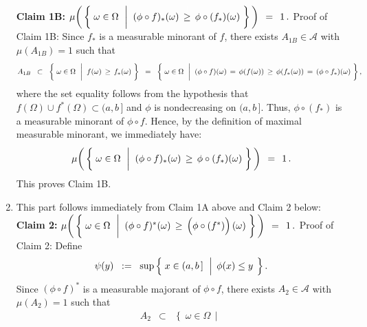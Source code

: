 \begin{enumerate}
	\vskip 0.5cm
	\noindent
	\textbf{Claim 1B:}\quad
	$\mu\!\left(\,\left\{\;
		\omega \in \Omega
		\,\;\left\vert\;\;
		(\phi \circ f)_{*}(\omega) \,\overset{{\color{white}\vert}}{\geq}\, \phi \circ (f_{*})(\omega)
		\right.
	\,\right\}\,\right)
	\,\;=\;\, 1\,.$
	\vskip 0.2cm
	\noindent
	Proof of Claim 1B:\;\;
	Since $f_{*}$ is a measurable minorant of $f$,
	there exists $A_{1B} \in \mathcal{A}$ with $\mu(A_{1B}) = 1$ such that
	\begin{equation*}
	A_{1B}
	\;\;\subset\;\;
		\left\{\;
			\omega \in \Omega
			\,\;\left\vert\;\;
			f(\omega) \,\overset{{\color{white}\vert}}{\geq}\, f_{*}(\omega)
		\right.
		\,\right\}
	\;\; = \;\;
		\left\{\;
			\omega \in \Omega
			\,\;\left\vert\;\;
			(\phi \circ f)(\omega) \,=\, \phi(f(\omega)) \,\overset{{\color{white}\vert}}{\geq}\, \phi(f_{*}(\omega)) \,=\, (\phi \circ f_{*})(\omega)
		\right.
		\,\right\},
	\end{equation*}
	where the set equality follows from the hypothesis that $f(\Omega) \cup f^{*}(\Omega) \subset (a,b\,]$
	and $\phi$ is nondecreasing on $(a,b\,]$.
	Thus, $\phi \circ (f_{*})$ is a measurable minorant of $\phi \circ f$.
	Hence, by the definition of maximal measurable minorant, we immediately have:
	\begin{equation*}
	\mu\!\left(\,\left\{\;
		\omega \in \Omega
		\,\;\left\vert\;\;
		(\phi \circ f)_{*}(\omega) \,\overset{{\color{white}\vert}}{\geq}\, \phi \circ (f_{*})(\omega)
		\right.
	\,\right\}\,\right)
	\,\;=\;\, 1\,.
	\end{equation*}
	This proves Claim 1B.
\item
	This part follows immediately from Claim 1A above and Claim 2 below:
	\vskip 0.3cm
	\noindent
	\textbf{Claim 2:}\quad
	$\mu\!\left(\,\left\{\;
		\omega \in \Omega
		\,\;\left\vert\;\;
			(\phi \circ f)^{*}(\omega)
			\,\overset{{\color{white}\vert}}{\geq}\,
			\left(\overset{{\color{white}.}}{\phi} \circ (f^{*})\right)(\omega)
		\right.
	\,\right\}\,\right)
	\,\;=\;\, 1\,.$
	\vskip 0.2cm
	\noindent
	Proof of Claim 2:\;\;
	Define
	\begin{equation*}
	\psi(y)
	\;\; := \;\;
		\sup\left\{\;
			x \in (a,b\,]
		\,\;\left\vert\;\,
			\overset{{\color{white}.}}{\phi}(x) \leq y
		\right.
		\;\right\}.
	\end{equation*}
	Since $(\phi \circ f)^{*}$ is a measurable majorant of $\phi \circ f$,
	there exists $A_{2} \in \mathcal{A}$ with $\mu(A_{2}) = 1$ such that
	\begin{eqnarray*}
	A_{2}
	&\subset&
		\left\{\;
			\omega \in \Omega
			\,\;\left\vert\;\;

\end{eqnarray*}
\end{enumerate}
